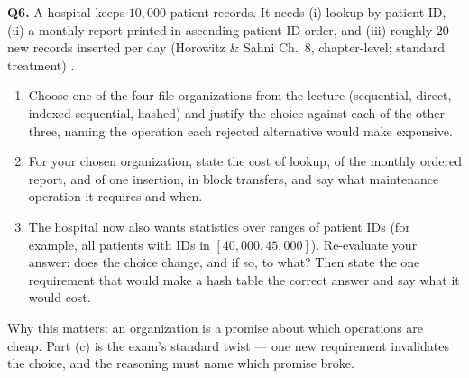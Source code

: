 \documentclass[11pt]{article}
\begin{document}
\textbf{Q6.} A hospital keeps $10{,}000$ patient records. It needs (i) lookup by patient ID, (ii) a monthly report printed in ascending patient-ID order, and (iii) roughly $20$ new records inserted per day (Horowitz \& Sahni Ch.~8, chapter-level; standard treatment) \cite{HorowitzSahni2008_fundamentals_data_structures}.
\begin{enumerate}
  \item[(a)] Choose one of the four file organizations from the lecture (sequential, direct, indexed sequential, hashed) and justify the choice against each of the other three, naming the operation each rejected alternative would make expensive.
  \item[(b)] For your chosen organization, state the cost of lookup, of the monthly ordered report, and of one insertion, in block transfers, and say what maintenance operation it requires and when.
  \item[(c)] The hospital now also wants statistics over ranges of patient IDs (for example, all patients with IDs in $[40{,}000, 45{,}000]$). Re-evaluate your answer: does the choice change, and if so, to what? Then state the one requirement that would make a hash table the correct answer and say what it would cost.
\end{enumerate}
Why this matters: an organization is a promise about which operations are cheap. Part (c) is the exam's standard twist --- one new requirement invalidates the choice, and the reasoning must name which promise broke.



\end{document}
